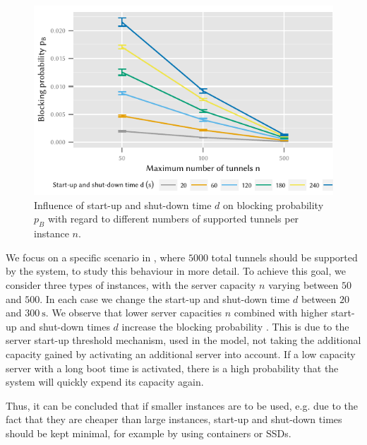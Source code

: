 \begin{figure}
  \centering
  \includegraphics{cloud/virtualized_network_functions/performance_evaluation/figures/compare_maxinstances_block}
  \caption{Influence of start-up and shut-down time \(d\) on blocking probability \(p_B\) with regard to different numbers of supported tunnels per instance \(n\).}
  \label{fig:cloud_virtualized_network_functions:startup_shutdown:compare_maxinstances_block}
\end{figure}

We focus on a specific scenario in , where \(5000\) total tunnels should be supported by the system, to study this behaviour in more detail.
To achieve this goal, we consider three types of instances, with the server capacity \(n\) varying between \(50\) and \(500\).
In each case we change the start-up and shut-down time \(d\) between \(20\) and \(\SI{300}{\second}\).
We observe that lower server capacities \(n\) combined with higher start-up and shut-down times \(d\) increase the blocking probability \blockingprobability.
This is due to the server start-up threshold mechanism, used in the model, not taking the additional capacity gained by activating an additional server into account.
If a low capacity server with a long boot time is activated, there is a high probability that the system will quickly expend its capacity again.

Thus, it can be concluded that if smaller instances are to be used, e.g. due to the fact that they are cheaper than large instances, start-up and shut-down times should be kept minimal, for example by using containers or \glspl{SSD}.
